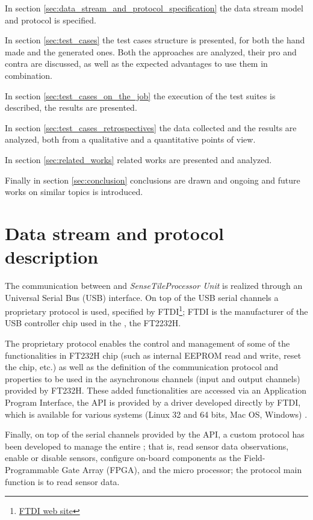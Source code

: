 \documentclass{article} \usepackage{times}
\newcommand{\myhref}[2]{\ifpdf\href{#1}{#2}\else\htmladdnormallinkfoot{#2}{#1}\fi}
\newcommand{\ST}{\emph{SenseTile}\xspace}
\newcommand{\STPU}{\ST \emph{Processor Unit}\xspace}
\begin{document}
In section \ref{sec:data_stream_and_protocol_specification} the data
stream model and protocol is specified.

In section \ref{sec:test_cases} the test cases structure is presented,
for both the hand made and the generated ones.  Both the approaches
are analyzed, their pro and contra are discussed, as well as the
expected advantages to use them in combination.

In section \ref{sec:test_cases_on_the_job} the execution of the test
suites is described, the results are presented.

In section \ref{sec:test_cases_retrospectives} the data collected and
the results are analyzed, both from a qualitative and a quantitative
points of view.

In section \ref{sec:related_works} related works are presented and
analyzed.

Finally in section \ref{sec:conclusion} conclusions are drawn and
ongoing and future works on similar topics is introduced.



\section{Data stream and protocol description}
\label{sec:data_stream_and_protocol_description}

The communication between \STSB and \STPU is realized through an
Universal Serial Bus (USB) interface.  On top of the USB serial
channels a proprietary protocol is used, specified by
FTDI\footnote{\myhref{http://www.ftdichip.com/}{FTDI web site}}; FTDI
is the manufacturer of the USB controller chip used in the \STSB, the
FT2232H\cite{ftdi_ft232h_2009}.

The proprietary protocol enables the control and management of some of
the functionalities in FT232H chip (such as internal EEPROM read and
write, reset the chip, etc.) as well as the definition of the
communication protocol and properties to be used in the asynchronous
channels (input and output channels) provided by FT232H.  These added
functionalities are accessed via an Application Program Interface, the
API is provided by a driver developed directly by FTDI, which is
available for various systems (Linux 32 and 64 bits, Mac OS, Windows)
\cite{ftdi_d2xx_api_2009}.

Finally, on top of the serial channels provided by the API, a custom
protocol has been developed to manage the entire \STSB; that is, read
sensor data observations, enable or disable sensors, configure
on-board components as the Field-Programmable Gate Array (FPGA), and
the micro processor; the protocol main function is to read sensor
data.
\end{document}
